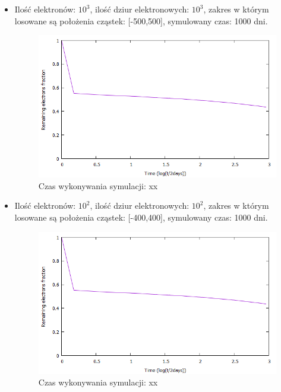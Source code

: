 \begin{itemize}
\item Ilość elektronów: $10^{3}$, ilość dziur elektronowych: $10^{3}$, zakres w którym losowane są położenia cząstek: [-500,500], symulowany czas: 1000 dni.
\begin{figure}[H]
\centering
\includegraphics[width=17cm]{wykres2}
\caption{ Czas wykonywania symulacji: xx}
\label{fig:Tunelowanie}
\end{figure}

\item Ilość elektronów: $10^{2}$, ilość dziur elektronowych: $10^{2}$, zakres w którym losowane są położenia cząstek: [-400,400], symulowany czas: 1000 dni.
\begin{figure}[H]
\centering
\includegraphics[width=17cm]{wykres2}
\caption{ Czas wykonywania symulacji: xx}
\label{fig:Tunelowanie}
\end{figure}


\end{itemize}
